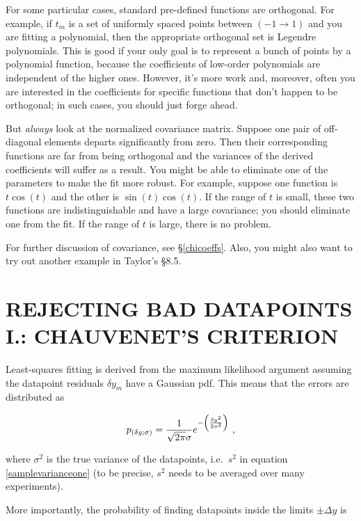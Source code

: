 \documentclass[psfig,preprint]{aastex}
\begin{document}
	For some particular cases, standard pre-defined functions are
orthogonal. For example, if $t_m$ is a set of uniformly spaced points
between $(-1 \rightarrow 1)$ and you are fitting a polynomial, then the
appropriate orthogonal set is Legendre polynomials. This is good if your
only goal is to represent a bunch of points by a polynomial function,
because the coefficients of low-order polynomials are independent of the
higher ones. However, it's more work and, moreover, often you are
interested in the coefficients for specific functions that don't happen
to be orthogonal; in such cases, you should just forge ahead. 

	But {\it always} look at the normalized covariance matrix.
Suppose one pair of off-diagonal elements departs significantly from
zero. Then their corresponding functions are far from being orthogonal
and the variances of the derived coefficients will suffer as a result.
You might be able to eliminate one of the parameters to make the fit
more robust. For example, suppose one function is $t \cos (t)$ and the
other is $\sin(t) \cos (t)$. If the range of $t$ is small, these two
functions are indistinguishable and have a large covariance; you should
eliminate one from the fit. If the range of $t$ is large, there is no
problem.

	For further discussion of covariance, see \S \ref {chicoeffs}.
Also, you might also want to try out another example in Taylor's \S 8.5.

\section{REJECTING BAD DATAPOINTS I.: CHAUVENET'S CRITERION}
\label{chauvenetsection}

	Least-squares fitting is derived from the maximum likelihood
argument assuming the datapoint residuals $\delta y_m$ have a Gaussian
pdf. This means that the errors are distributed as 

\begin{equation}
p_{(\delta y; \sigma)} = {1 \over \sqrt{2\pi} \sigma} 
    e^{-\left( \delta y^2 \over 2 \sigma^2 \right)} \ ,
\end{equation}

\noindent where $\sigma^2$ is the true variance of the datapoints, i.e.\
$s^2$ in equation \ref{samplevarianceone} (to be precise, $s^2$ needs to
be averaged over many experiments). 

	More importantly, the probability of finding datapoints inside
the limits $\pm \Delta y$ is 
\end{document}
